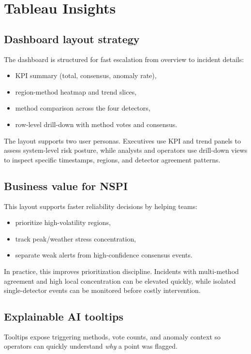 \section{Tableau Insights}

\subsection{Dashboard layout strategy}
The dashboard is structured for fast escalation from overview to incident details:
\begin{itemize}
	\item KPI summary (total, consensus, anomaly rate),
	\item region-method heatmap and trend slices,
	\item method comparison across the four detectors,
	\item row-level drill-down with method votes and consensus.
\end{itemize}

The layout supports two user personas. Executives use KPI and trend panels to assess system-level risk posture, while analysts and operators use drill-down views to inspect specific timestamps, regions, and detector agreement patterns.

\subsection{Business value for NSPI}
This layout supports faster reliability decisions by helping teams:
\begin{itemize}
	\item prioritize high-volatility regions,
	\item track peak/weather stress concentration,
	\item separate weak alerts from high-confidence consensus events.
\end{itemize}

In practice, this improves prioritization discipline. Incidents with multi-method agreement and high local concentration can be elevated quickly, while isolated single-detector events can be monitored before costly intervention.

\subsection{Explainable AI tooltips}
Tooltips expose triggering methods, vote counts, and anomaly context so operators can quickly understand \emph{why} a point was flagged.

